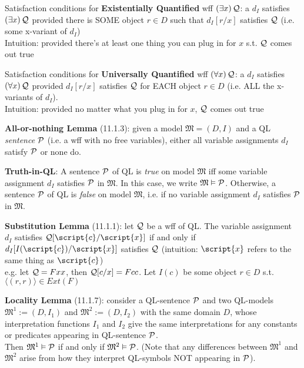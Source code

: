 Satisfaction conditions for \textbf{Existentially Quantified} wff $\qt{\exists}{x} \metav{Q}$: a $d_I$ satisfies $\qt{\exists}{x} \metav{Q}$ provided there is SOME object $r \in D$ such that $d_I [r/x]$ satisfies $\metav{Q}$ (i.e. some x-variant of $d_I$)\\ Intuition: provided there's at least one thing you can plug in for $x$ s.t. $\metav{Q}$ comes out true

Satisfaction conditions for \textbf{Universally Quantified} wff $\qt{\forall}{x} \metav{Q}$: a $d_I$ satisfies $\qt{\forall}{x} \metav{Q}$ provided $d_I [r/x]$ satisfies $\metav{Q}$ for EACH object $r \in D$ (i.e. ALL the x-variants of $d_I$). \\ Intuition: provided no matter what you plug in for $x$, $\metav{Q}$ comes out true

\textbf{All-or-nothing Lemma} (11.1.3): given a model $\mathfrak{M} = (D, I)$ and a QL \textit{sentence} $\metav{P}$ (i.e. a wff with no free variables), either all variable assignments $d_I$ satisfy $\metav{P}$ or none do.

\textbf{Truth-in-QL}: A sentence $\metav{P}$ of QL is \emph{true} on model $\mathfrak{M}$ iff some variable assignment $d_I$ satisfies $\metav{P}$ in $\mathfrak{M}$. In this case, we write $\mathfrak{M} \entails \metav{P}$. Otherwise, a sentence $\metav{P}$ of QL is \emph{false} on model $\mathfrak{M}$, i.e. if no variable assignment $d_I$ satisfies $\metav{P}$ in $\mathfrak{M}$.

\textbf{Substitution Lemma} (11.1.1): let $\metav{Q}$ be a wff of QL. The variable assignment $d_I$ satisfies $\metav{Q}\substitute{\script{x}}{\script{c}}$ if and only if $d_I [I(\script{c})/\script{x}]$ satisfies $\metav{Q}$ (intuition: $\script{x}$ refers to the same thing as $\script{c}$) \\ e.g. let $\metav{Q}=Fxx$, then $\metav{Q}\substitute{x}{c} = Fcc$. Let $I(c)$ be some object $r\in D$ s.t. $\langle (r,r) \rangle \in Ext(F)$

\textbf{Locality Lemma} (11.1.7): consider a QL-sentence $\metav{P}$ and two QL-models $\mathfrak{M}^1 := (D, I_1)$ and $\mathfrak{M}^2 := (D, I_2)$ with the same domain $D$, whose interpretation functions $I_1$ and $I_2$ give the same interpretations for any constants or predicates appearing in QL-sentence $\metav{P}$. \\ Then  $\mathfrak{M}^1 \entails \metav{P}$ if and only if $\mathfrak{M}^2 \entails \metav{P}$. (Note that any differences between $\mathfrak{M}^1$ and $\mathfrak{M}^2$ arise from how they interpret QL-symbols NOT appearing in $\metav{P}$).  


